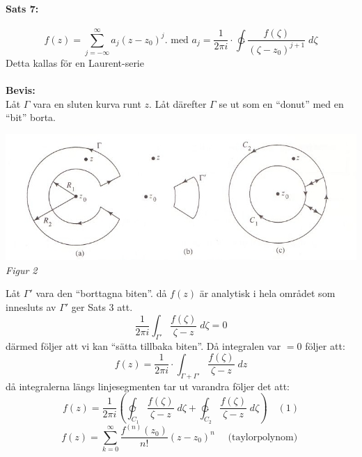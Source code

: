 \paragraph{Sats 7:}
\[
	f(z) = \sum_{j = - \infty}^\infty a_j (z - z_0)^j. \text{ med } a_j = \frac {1} {2 \pi i} \cdot \ointctrclockwise
		\frac {f(\zeta)} {(\zeta - z_0)^{j + 1}} \; d\zeta
\]
Detta kallas för en Laurent-serie\\
\\
{\bf Bevis:}\\
Låt $\Gamma$ vara en sluten kurva runt $z$.
Låt därefter $\Gamma$ se ut som en ``donut'' med en ``bit'' borta.
\begin{center}
	\includegraphics[scale=0.5]{aoeu.jpg}
	{\it Figur 2}
\end{center}
Låt $\Gamma'$ vara den ``borttagna biten''. då $f(z)$ är analytisk i hela området som innesluts av $\Gamma'$ ger Sats 3 att.
\[
	\frac {1} {2 \pi i} \int_{\Gamma'} \frac {f(\zeta)} {\zeta - z} \; d\zeta = 0
\]
därmed följer att vi kan ``sätta tillbaka biten''. Då integralen var $= 0$ följer att:
\[
	f(z) = \frac {1} {2 \pi i} \cdot \int_{\Gamma + \Gamma'} \frac {f(\zeta)} {\zeta - z} \; dz
\]
då integralerna längs linjesegmenten tar ut varandra följer det att:
\[
	f(z) = \frac {1} {2 \pi i} \left ( \varointclockwise_{C_1} \frac {f(\zeta)} {\zeta - z} \; d\zeta + 
		\ointctrclockwise_{C_2} \frac {f(\zeta)} {\zeta - z} \; d\zeta \right ) \quad (1)
\]
\[
	f(z) = \sum_{k = 0}^\infty \frac {f^{(n)}(z_0)} {n!} (z - z_0)^n \quad \text{ (taylorpolynom) }
\]

